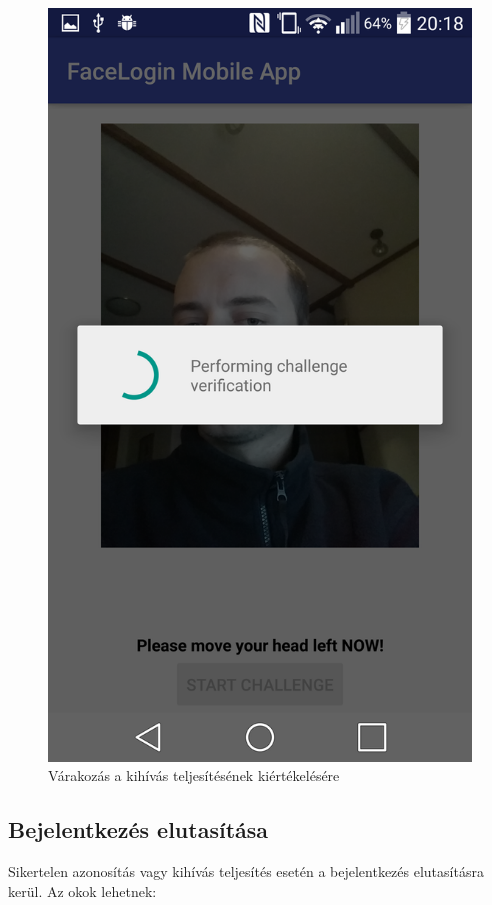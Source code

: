 \begin{figure}[h]
\begin{minipage}{.30\textwidth}
     \includegraphics[scale=0.10]{img/performing_challenge_verification}
     \caption{Várakozás a kihívás teljesítésének kiértékelésére}
 \end{minipage}
\end{figure}

\subsection{Bejelentkezés elutasítása}
Sikertelen azonosítás vagy kihívás teljesítés esetén a bejelentkezés elutasításra kerül. Az okok lehetnek:

